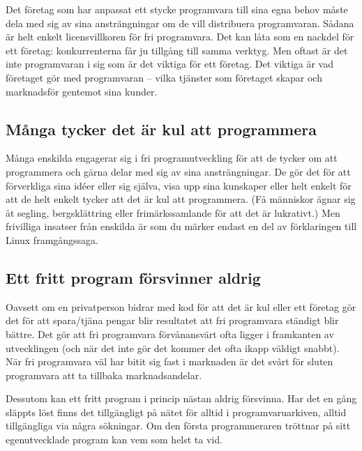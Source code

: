 \documentclass[a4paper,final]{memoir} %
\begin{document}
Det företag som har anpassat ett stycke programvara till sina egna behov måste dela med sig av sina ansträngningar om de vill distribuera programvaran. Sådana är helt enkelt licensvillkoren för fri programvara. Det kan låta som en nackdel för ett företag: konkurrenterna får ju tillgång till samma verktyg. Men oftast är det inte programvaran i sig som är det viktiga för ett företag. Det viktiga är vad företaget gör med programvaran -- vilka tjänster som företaget skapar och marknadsför gentemot sina kunder.


\subsection{Många tycker det är kul att programmera}

Många enskilda engagerar sig i fri programutveckling för att de tycker om att programmera och gärna delar med sig av sina ansträngningar. De gör det för att  förverkliga sina idéer eller sig själva, visa upp sina kunskaper eller helt enkelt för att de helt enkelt tycker att det är kul att programmera. (Få människor ägnar sig åt segling, bergsklättring eller frimärkssamlande för att det är lukrativt.) Men frivilliga insatser från enskilda är som du märker endast en del av förklaringen till Linux framgångssaga. 


\subsection{Ett fritt program försvinner aldrig}

Oavsett om en privatperson bidrar med kod för att det är kul eller ett företag gör det för att spara/tjäna pengar blir resultatet att fri programvara ständigt blir bättre. Det gör att fri programvara förvånansvärt ofta ligger i framkanten av utvecklingen (och när det inte gör det kommer det ofta ikapp väldigt snabbt). När fri programvara väl har bitit sig fast i marknaden är det svårt för sluten programvara att ta tillbaka marknadsandelar. 

Dessutom kan ett fritt program i princip nästan aldrig försvinna. Har det en gång släppts löst finns det tillgängligt på nätet för alltid i programvaruarkiven, alltid tillgängliga via några sökningar. Om den första programmeraren tröttnar på sitt egenutvecklade program kan vem som helst ta vid.
\end{document}
